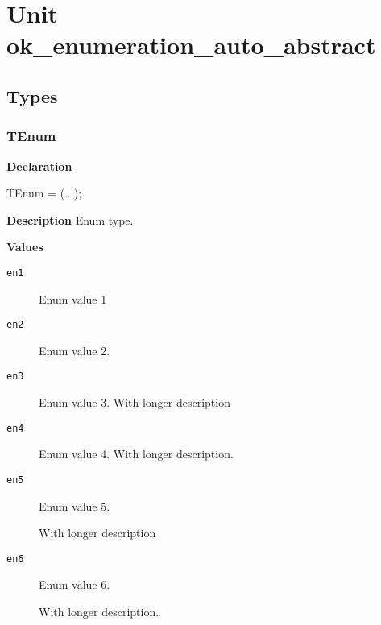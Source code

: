 \documentclass{report}
\begin{document}
\newlength{\tmplength}
\chapter{Unit ok{\_}enumeration{\_}auto{\_}abstract}
\section{Types}
\subsection*{TEnum}
\begin{list}{}{
\setlength{\itemindent}{0cm}
\setlength{\listparindent}{0cm}
\setlength{\leftmargin}{\evensidemargin}
\addtolength{\leftmargin}{\tmplength}
\settowidth{\labelsep}{X}
\addtolength{\leftmargin}{\labelsep}
\setlength{\labelwidth}{\tmplength}
}
\begin{flushleft}
\item[\textbf{Declaration}\hfill]
\begin{ttfamily}
TEnum = (...);\end{ttfamily}


\end{flushleft}
\par
\item[\textbf{Description}]
Enum type.\item[\textbf{Values}]
\begin{description}
\item[\texttt{en1}] Enum value 1
\item[\texttt{en2}] Enum value 2.
\item[\texttt{en3}] Enum value 3. With longer description
\item[\texttt{en4}] Enum value 4. With longer description.
\item[\texttt{en5}] Enum value 5.

With longer description
\item[\texttt{en6}] Enum value 6.

With longer description.
\end{description}


\end{list}
\end{document}
